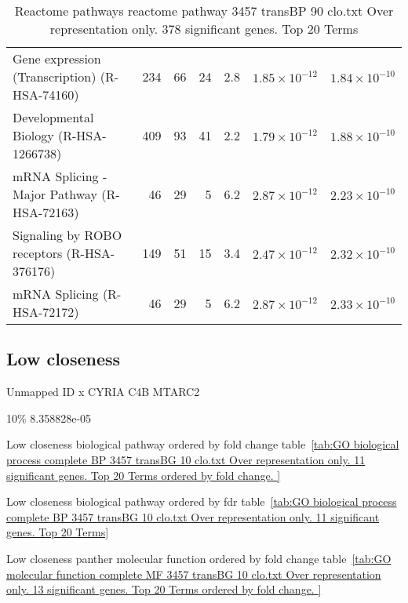 \begin{table}[ht]
\begin{adjustbox}{width=\textwidth}
\begin{tabular}{lrrrrrr}
  Gene expression (Transcription) (R-HSA-74160) & 234 & 66 & 24 & 2.8 & $1.85 \times 10^{-12}$ & $1.84 \times 10^{-10}$ \\ 
  Developmental Biology (R-HSA-1266738) & 409 & 93 & 41 & 2.2 & $1.79 \times 10^{-12}$ & $1.88 \times 10^{-10}$ \\ 
  mRNA Splicing - Major Pathway (R-HSA-72163) & 46 & 29 & 5 & 6.2 & $2.87 \times 10^{-12}$ & $2.23 \times 10^{-10}$ \\ 
  Signaling by ROBO receptors (R-HSA-376176) & 149 & 51 & 15 & 3.4 & $2.47 \times 10^{-12}$ & $2.32 \times 10^{-10}$ \\ 
  mRNA Splicing (R-HSA-72172) & 46 & 29 & 5 & 6.2 & $2.87 \times 10^{-12}$ & $2.33 \times 10^{-10}$ \\ 
   \hline
\end{tabular}
\end{adjustbox}
\caption{Reactome pathways reactome pathway 3457 transBP 90 clo.txt Over representation only. 378 significant genes. Top 20 Terms} 
\label{tab:Reactome pathways reactome pathway 3457 transBP 90 clo.txt Over representation only. 378 significant genes. Top 20 Terms}
\end{table}










\clearpage

\subsection{Low closeness}

Unmapped
ID
x
CYRIA
C4B
MTARC2

         10\% 
8.358828e-05 




Low closeness biological pathway ordered by fold change table~\ref{tab:GO biological process complete BP 3457 transBG 10 clo.txt Over representation only. 11 significant genes. Top 20 Terms ordered by fold change. }

Low closeness biological pathway ordered by fdr table~\ref{tab:GO biological process complete BP 3457 transBG 10 clo.txt Over representation only. 11 significant genes. Top 20 Terms}

Low closeness panther molecular function ordered by fold change table~\ref{tab:GO molecular function complete MF 3457 transBG 10 clo.txt Over representation only. 13 significant genes. Top 20 Terms ordered by fold change. }


